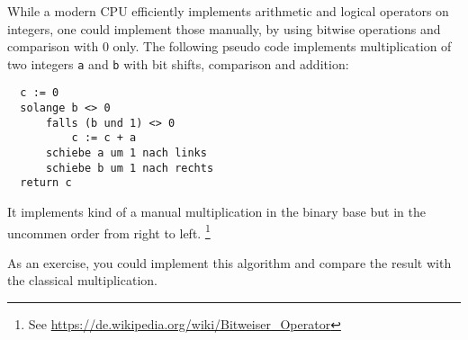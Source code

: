 \begin{example}
  While a modern CPU efficiently implements arithmetic and logical operators on integers, one could implement those manually, by using bitwise
  operations and comparison with 0 only. The following pseudo code implements multiplication of two integers \texttt{a} and \texttt{b} with
  bit shifts, comparison and addition:
  \begin{verbatim}
  c := 0
  solange b <> 0
      falls (b und 1) <> 0
          c := c + a
      schiebe a um 1 nach links
      schiebe b um 1 nach rechts
  return c
  \end{verbatim}
  It implements kind of a manual multiplication in the binary base but in the uncommen order from right to left.
  \footnote{See \url{https://de.wikipedia.org/wiki/Bitweiser_Operator}}

  As an exercise, you could implement this algorithm and compare the result with the classical multiplication.
\end{example}

